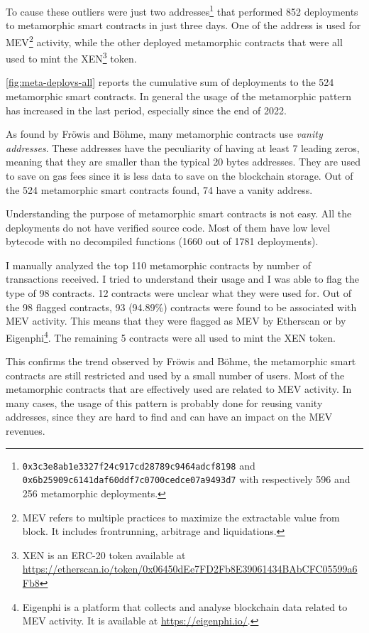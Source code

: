 To cause these outliers were just two addresses\footnote{{\tt 0x3c3e8ab1e3327f24c917cd28789c9464adcf8198} and \\{\tt 0x6b25909c6141daf60ddf7c0700cedce07a9493d7} with respectively 596 and 256 metamorphic deployments.} that performed 852 deployments to metamorphic smart contracts in just three days. One of the address is used for MEV\footnote{MEV refers to multiple practices to maximize the extractable value from block. It includes frontrunning, arbitrage and liquidations.} activity, while the other deployed metamorphic contracts that were all used to mint the XEN\footnote{XEN is an ERC-20 token available at \url{https://etherscan.io/token/0x06450dEe7FD2Fb8E39061434BAbCFC05599a6Fb8}} token.

\cref{fig:meta-deploys-all} reports the cumulative sum of deployments to the 524 metamorphic smart contracts. In general the usage of the metamorphic pattern has increased in the last period, especially since the end of 2022.

As found by Fröwis and Böhme, many metamorphic contracts use \textit{vanity addresses}. These addresses have the peculiarity of having at least 7 leading zeros, meaning that they are smaller than the typical 20 bytes addresses. They are used to save on gas fees since it is less data to save on the blockchain storage. Out of the 524 metamorphic smart contracts found, 74 have a vanity address.

Understanding the purpose of metamorphic smart contracts is not easy. All the deployments do not have verified source code. Most of them have low level bytecode with no decompiled functions (1660 out of 1781 deployments). 

I manually analyzed the top 110 metamorphic contracts by number of transactions received. I tried to understand their usage and I was able to flag the type of 98 contracts. 12 contracts were unclear what they were used for. Out of the 98 flagged contracts, 93 (94.89\%) contracts were found to be associated with MEV activity. This means that they were flagged as MEV by Etherscan or by Eigenphi\footnote{Eigenphi is a platform that collects and analyse blockchain data related to MEV activity. It is available at \url{https://eigenphi.io/}.}. The remaining 5 contracts were all used to mint the XEN token. 

This confirms the trend observed by Fröwis and Böhme, the metamorphic smart contracts are still restricted and used by a small number of users. Most of the metamorphic contracts that are effectively used are related to MEV activity. In many cases, the usage of this pattern is probably done for reusing vanity addresses, since they are hard to find and can have an impact on the MEV revenues.

